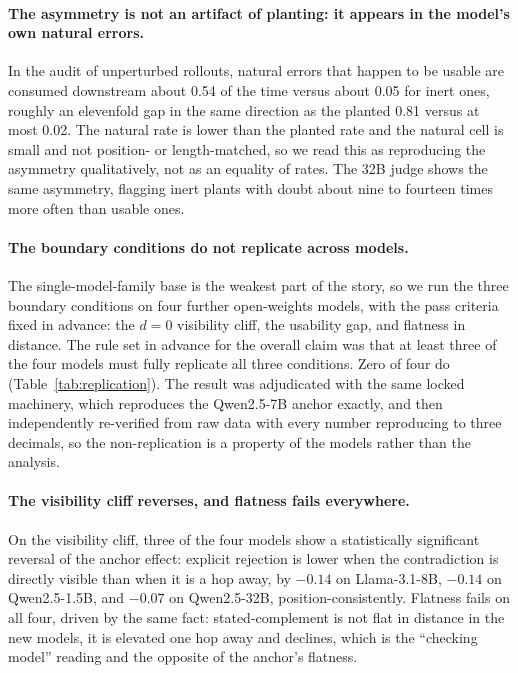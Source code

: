 \paragraph{The asymmetry is not an artifact of planting: it appears in the
model's own natural errors.} In the audit of unperturbed rollouts, natural
errors that happen to be usable are consumed downstream about 0.54 of the
time versus about 0.05 for inert ones, roughly an elevenfold gap in the
same direction as the planted 0.81 versus at most 0.02.
The natural rate is lower than the planted rate and the natural cell is
small and not position- or length-matched, so we read this as reproducing
the asymmetry qualitatively, not as an equality of rates.
The 32B judge shows the same asymmetry, flagging inert plants with doubt
about nine to fourteen times more often than usable ones.

\paragraph{The boundary conditions do not replicate across models.} The
single-model-family base is the weakest part of the story, so we run the
three boundary conditions on four further open-weights
models, with the pass criteria fixed in advance: the $d{=}0$ visibility
cliff, the usability gap, and flatness in distance. The rule set in advance
for the overall claim was that at least three of the four models must fully
replicate all three conditions. Zero of four do (Table~\ref{tab:replication}).
The result was adjudicated with the same locked machinery, which reproduces
the Qwen2.5-7B anchor exactly, and then independently re-verified from raw
data with every number reproducing to three decimals, so the non-replication
is a property of the models rather than the analysis.

\paragraph{The visibility cliff reverses, and flatness fails everywhere.}
On the visibility cliff, three of the four models show a statistically
significant reversal of the anchor effect: explicit rejection is lower when
the contradiction is directly visible than when it is a hop away, by $-0.14$
on Llama-3.1-8B, $-0.14$ on Qwen2.5-1.5B, and $-0.07$ on Qwen2.5-32B,
position-consistently.
Flatness fails on all four, driven by the same fact: stated-complement is
not flat in distance in the new models, it is elevated one hop away and
declines, which is the ``checking model'' reading and the opposite of the
anchor's flatness.


